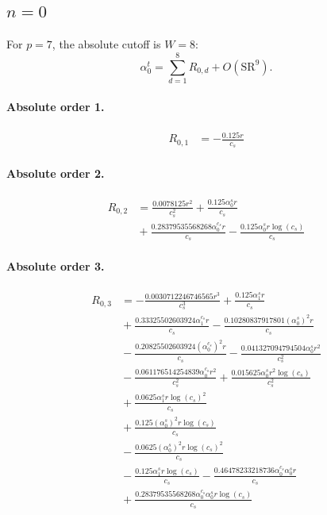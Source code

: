 \documentclass[10pt]{article}
\begin{document}
\subsection{$n=0$}
For $p=7$, the absolute cutoff is $W=8$:
\[\alpha_{0}^t=\sum_{d=1}^{8}R_{0,d}+O(\mathrm{SR}^{9}).\]
\paragraph{Absolute order 1.}
\begin{align*}
R_{0,1} &=  - \frac{0.125 r}{c_{s}}
\end{align*}

\paragraph{Absolute order 2.}
\begin{align*}
R_{0,2} &= \frac{0.0078125 r^{2}}{c_{s}^{2}} + \frac{0.125 \alpha_{0}^s r}{c_{s}} \\
&{}  + \frac{0.28379535568268 \alpha_{0}^{c_s} r}{c_{s}} - \frac{0.125 \alpha_{0}^s r \log{\left(c_{s} \right)}}{c_{s}}
\end{align*}

\paragraph{Absolute order 3.}
\begin{align*}
R_{0,3} &=  - \frac{0.0030712246746565 r^{3}}{c_{s}^{3}} + \frac{0.125 \alpha_{1}^s r}{c_{s}} \\
&{}  + \frac{0.33325502603924 \alpha_{1}^{c_s} r}{c_{s}} - \frac{0.10280837917801 \left(\alpha_{0}^s\right)^{2} r}{c_{s}} \\
&{}  - \frac{0.20825502603924 \left(\alpha_{0}^{c_s}\right)^{2} r}{c_{s}} - \frac{0.041327094794504 \alpha_{0}^s r^{2}}{c_{s}^{2}} \\
&{}  - \frac{0.061176514254839 \alpha_{0}^{c_s} r^{2}}{c_{s}^{2}} + \frac{0.015625 \alpha_{0}^s r^{2} \log{\left(c_{s} \right)}}{c_{s}^{2}} \\
&{}  + \frac{0.0625 \alpha_{1}^s r \log{\left(c_{s} \right)}^{2}}{c_{s}} \\
&{}  + \frac{0.125 \left(\alpha_{0}^s\right)^{2} r \log{\left(c_{s} \right)}}{c_{s}} \\
&{}  - \frac{0.0625 \left(\alpha_{0}^s\right)^{2} r \log{\left(c_{s} \right)}^{2}}{c_{s}} \\
&{}  - \frac{0.125 \alpha_{1}^s r \log{\left(c_{s} \right)}}{c_{s}} - \frac{0.46478233218736 \alpha_{0}^{c_s} \alpha_{0}^s r}{c_{s}} \\
&{}  + \frac{0.28379535568268 \alpha_{0}^{c_s} \alpha_{0}^s r \log{\left(c_{s} \right)}}{c_{s}}
\end{align*}
\end{document}

